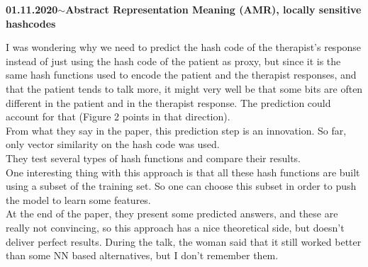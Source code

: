 \documentclass[11pt,a4paper]{article}
\newenvironment{loggentry}[2]%
{\noindent\textbf{#1}\hspace{1cm}$\mathbf{\sim}$\text{ }\textbf{#2}\\}{\vspace{0.5cm}}
\begin{document}
\begin{loggentry}{01.11.2020}{Abstract Representation Meaning (AMR), locally sensitive hashcodes}
\begin{enumerate}
\end{enumerate}
I was wondering why we need to predict the hash code of the therapist's response instead of just using the hash code of the patient as proxy, but since it is the same hash functions used to encode the patient and the therapist responses, and that the patient tends to talk more, it might very well be that some bits are often different in the patient and in the therapist response. The prediction could account for that (Figure 2 points in that direction).\\
From what they say in the paper, this prediction step is an innovation. So far, only vector similarity on the hash code was used.\\
They test several types of hash functions and compare their results.\\
One interesting thing with this approach is that all these hash functions are built using a subset of the training set. So one can choose this subset in order to push the model to learn some features.\\
At the end of the paper, they present some predicted answers, and these are really not convincing, so this approach has a nice theoretical side, but doesn't deliver perfect results. During the talk, the woman said that it still worked better than some NN based alternatives, but I don't remember them.

\end{loggentry}
\end{document}
